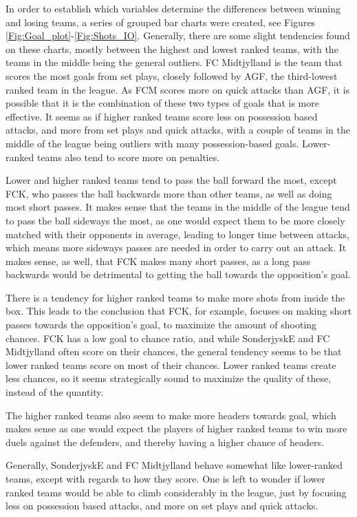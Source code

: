 In order to establish which variables determine the differences between
winning and losing teams, a series of grouped bar charts were created, see
Figures \ref{Fig:Goal_plot}-\ref{Fig:Shots_IO}.
Generally, there are some slight tendencies found on these charts, mostly between the highest and lowest ranked teams, with the teams in the middle being the general outliers. 
FC Midtjylland is the team that scores the most goals from set plays, closely followed by AGF, the third-lowest ranked team in the league. As FCM scores more on quick attacks than AGF, it is possible that it is the combination of these two types of goals that is more effective. It seems as if higher ranked teams score less on possession based attacks, and more from set plays and quick attacks, with a couple of teams in the middle of the league being outliers with many possession-based goals. Lower-ranked teams also tend to score more on penalties. 

Lower and higher ranked teams tend to pass the ball forward the most, except FCK, who passes the ball backwards more than other teams, as well as doing most short passes. It makes sense that the teams in the middle of the league tend to pass the ball sideways the most, as one would expect them to be more closely matched with their opponents in average, leading to longer time between attacks, which means more sideways passes are needed in order to carry out an attack. It makes sense, as well, that FCK makes many short passes, as a long pass backwards would be detrimental to getting the ball towards the opposition's goal. 

There is a tendency for higher ranked teams to make more shots from inside the box. This leads to the conclusion that FCK, for example, focuses on making short passes towards the opposition's goal, to maximize the amount of shooting chances. FCK has a low goal to chance ratio, and while SonderjyskE and FC Midtjylland often score on their chances, the general tendency seems to be that lower ranked teams score on most of their chances. Lower ranked teams create less chances, so it seems strategically sound to maximize the quality of these, instead of the quantity. 

The higher ranked teams also seem to make more headers towards goal, which makes sense as one would expect the players of higher ranked teams to win more duels against the defenders, and thereby having a higher chance of headers.

Generally, SonderjyskE and FC Midtjylland behave somewhat like lower-ranked teams, except with regards to how they score. One is left to wonder if lower ranked teams would be able to climb considerably in the league, just by focusing less on possession based attacks, and more on set plays and quick attacks. 
